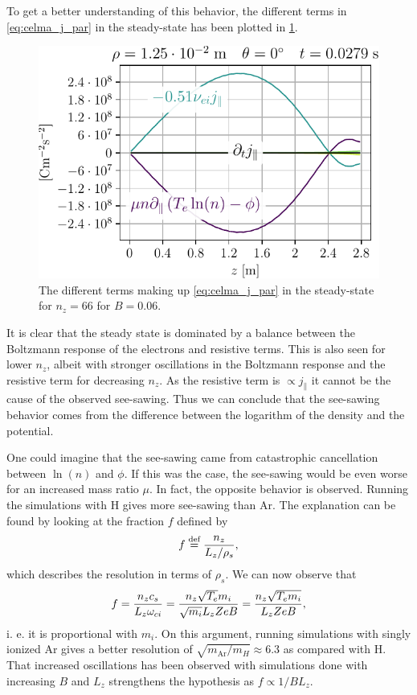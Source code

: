 \noindent
To get a better understanding of this behavior, the different terms in \cref{eq:celma_j_par} in the steady-state has been plotted in \cref{fig:jParBalance}.
%
\begin{figure}[htb]
    \centering
    \includegraphics{fig/results/jParBalanceNy66}
    \caption{The different terms making up \cref{eq:celma_j_par} in the steady-state for $n_z=66$ for $B=0.06$.
    }
    \label{fig:jParBalance}
\end{figure}
%
It is clear that the steady state is dominated by a balance between the Boltzmann response of the electrons and resistive terms.
This is also seen for lower $n_z$, albeit with stronger oscillations in the Boltzmann response and the resistive term for decreasing $n_z$.
As the resistive term is $\propto j_\|$ it cannot be the cause of the observed see-sawing.
Thus we can conclude that the see-sawing behavior comes from the difference between the logarithm of the density and the potential.

One could imagine that the see-sawing came from catastrophic cancellation between $\ln(n)$ and $\phi$.
If this was the case, the see-sawing would be even worse for an increased mass ratio $\mu$.
In fact, the opposite behavior is observed.
Running the simulations with $\text{H}$ gives more see-sawing than $\text{Ar}$.
The explanation can be found by looking at the fraction $f$ defined by
%
\begin{align}
    f \overset{\text{def}}{=} \frac{n_z}{L_z/\rho_s},
    \label{eq:defF}
\end{align}
%
which describes the resolution in terms of $\rho_s$.
We can now observe that
%
\begin{align*}
  f = \frac{n_zc_s}{L_z \omega_{ci}}
    = \frac{n_z\sqrt{T_e}m_i}{\sqrt{m_i} L_z ZeB}
    = \frac{n_z\sqrt{T_em_i}}{L_z ZeB},
\end{align*}
%
i. e. it is proportional with $m_i$.
On this argument, running simulations with singly ionized $\text{Ar}$ gives a better resolution of $\sqrt{m_{\text{Ar}}/m_H}\approx6.3$ as compared with $\text{H}$.
That increased oscillations has been observed with simulations done with increasing $B$ and $L_z$ strengthens the hypothesis as $f\propto 1/BL_z$.

